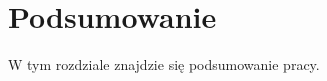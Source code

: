\chapter{Podsumowanie}
\thispagestyle{chapterBeginStyle}

W tym rozdziale znajdzie się podsumowanie pracy.





